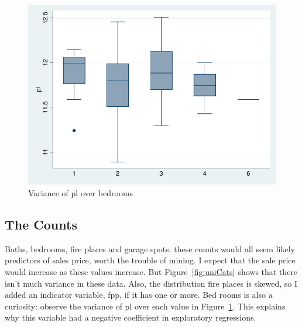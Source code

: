 \documentclass[twocolumn,11pt]{article}
\begin{document}
\begin{figure}[H]
\includegraphics[width=.9\linewidth]{figures/br-box-wow.pdf}
\caption{Variance of pl over bedrooms}
\label{fig:br-wow}
\end{figure}


\subsection*{The Counts}
Baths, bedrooms, fire places and garage spots:
these counts would all seem likely predictors of sales price, worth the trouble of mining.
I expect that the sale price would increase as these values increase.
But Figure~\ref{fig:uniCats} shows that there isn't much variance in these data.
Also, the distribution fire places is skewed, so I added an indicator variable, fpp, if it has one or more.
Bed rooms is also a curiosity: observe the variance of pl over each value in Figure~\ref{fig:br-wow}.
This explains why this variable had a negative coefficient in exploratory regressions.

\end{document}
